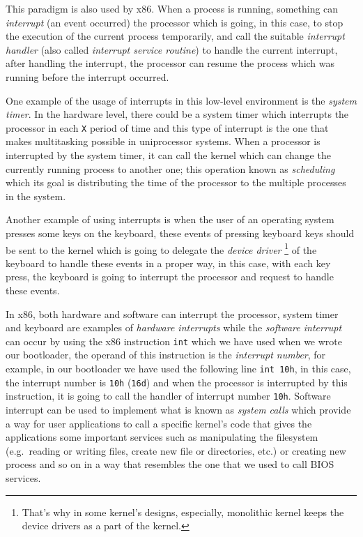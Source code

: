 This paradigm is also used by x86. When a process is running, something
can \emph{interrupt} (an event occurred) the processor which is going,
in this case, to stop the execution of the current process temporarily,
and call the suitable \emph{interrupt handler} (also called
\emph{interrupt service routine}) to handle the current interrupt, after
handling the interrupt, the processor can resume the process which was
running before the interrupt occurred.

One example of the usage of interrupts in this low-level environment is
the \emph{system timer}. In the hardware level, there could be a system
timer which interrupts the processor in each \lstinline!X! period of
time and this type of interrupt is the one that makes multitasking
possible in uniprocessor systems. When a processor is interrupted by the
system timer, it can call the kernel which can change the currently
running process to another one; this operation known as
\emph{scheduling} which its goal is distributing the time of the
processor to the multiple processes in the system.

Another example of using interrupts is when the user of an operating
system presses some keys on the keyboard, these events of pressing
keyboard keys should be sent to the kernel which is going to delegate
the \emph{device driver} \footnote{That's why in some kernel's designs,
  especially, monolithic kernel keeps the device drivers as a part of
  the kernel.} of the keyboard to handle these events in a proper way,
in this case, with each key press, the keyboard is going to interrupt
the processor and request to handle these events.

In x86, both hardware and software can interrupt the processor, system
timer and keyboard are examples of \emph{hardware interrupts} while the
\emph{software interrupt} can occur by using the x86 instruction
\lstinline!int! which we have used when we wrote our bootloader, the
operand of this instruction is the \emph{interrupt number}, for example,
in our bootloader we have used the following line \lstinline!int 10h!,
in this case, the interrupt number is \lstinline!10h! (\lstinline!16d!)
and when the processor is interrupted by this instruction, it is going
to call the handler of interrupt number \lstinline!10h!. Software
interrupt can be used to implement what is known as \emph{system calls}
which provide a way for user applications to call a specific kernel's
code that gives the applications some important services such as
manipulating the filesystem (e.g.~reading or writing files, create new
file or directories, etc.) or creating new process and so on in a way
that resembles the one that we used to call BIOS services.

